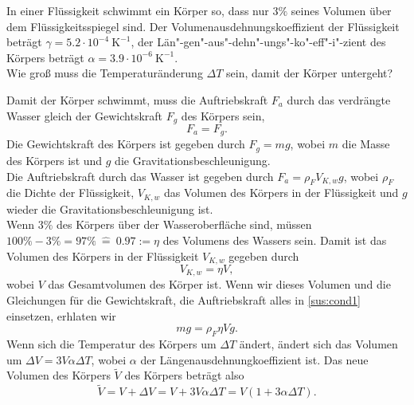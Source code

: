 \begin{Exercise}[label=sus, origin ={3. Runde IPhO 2014, Kurzaufgabe},difficulty = 2, title = {Schwimmen und Sinken}]
	In einer Flüssigkeit schwimmt ein Körper so, dass nur $3\%$ seines Volumen über dem Flüssigkeitsspiegel sind. 
	Der Volumenausdehnungskoeffizient der Flüssigkeit beträgt $\gamma = 5.2\cdot 10^{-4}~\mathrm{K}^{-1}$, der Län"-gen"-aus"-dehn"-ungs"-ko"-eff"-i"-zient des Körpers beträgt $\alpha = 3.9\cdot 10^{-6}~\mathrm{K}^{-1}$.\\
	Wie groß muss die Temperaturänderung $\Delta T$ sein, damit der Körper untergeht?
\end{Exercise}
\begin{Answer}[ref=sus]
		Damit der Körper schwimmt, muss die Auftriebskraft $F_a$ durch das verdrängte Wasser gleich der Gewichtskraft $F_g$ des Körpers sein,
		\begin{equation}\label{sus:cond1}
		F_a = F_g.
		\end{equation}
		Die Gewichtskraft des Körpers ist gegeben durch $F_g = mg$, wobei $m$ die Masse des Körpers ist und $g$ die Gravitationsbeschleunigung.\\
		\noindent
		Die Auftriebskraft durch das  Wasser ist gegeben durch $F_a = \rho_{F}V_{K,w}g$, wobei $\rho_{F}$ die Dichte der Flüssigkeit, $V_{K,w}$ das Volumen des Körpers in der Flüssigkeit und $g$ wieder die Gravitationsbeschleunigung ist.\\
		Wenn $3\%$ des Körpers über der Wasseroberfläche sind, müssen $100\%-3\%  = 97\%~ \hat{=}~ 0.97 := \eta $ des Volumens des Wassers sein. Damit ist das Volumen des Körpers in der Flüssigkeit $V_{K,w}$ gegeben durch
		\begin{equation}\label{sus:oldvol}
		V_{K,w} = \eta V,
		\end{equation}
		wobei $V$ das Gesamtvolumen des Körper ist. Wenn wir dieses Volumen und die Gleichungen für die Gewichtskraft, die Auftriebskraft alles in \eqref{sus:cond1} einsetzen, erhlaten wir
		\begin{equation}\label{sus:cond2}
		mg = \rho_{F}\eta V g.
		\end{equation}
		Wenn sich die Temperatur des Körpers um $\Delta T$ ändert, ändert sich das Volumen um $\Delta V = 3V\alpha \Delta T $, wobei $\alpha$ der Längenausdehnungkoeffizient ist. Das neue Volumen des Körpers $\tilde{V}$ des Körpers beträgt also
		\begin{equation}\label{sus:newvol}
		\tilde{V} = V + \Delta V = V + 3V\alpha \Delta T  = V \left(1+3\alpha \Delta T\right).
		\end{equation}

\end{Answer}
